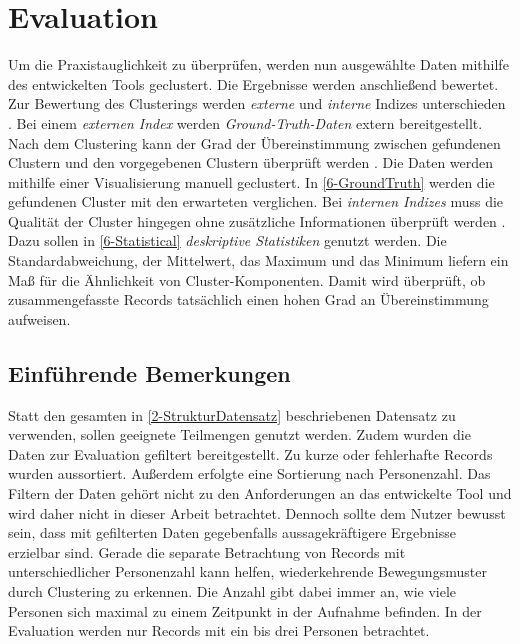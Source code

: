 \chapter{Evaluation}
\label{chapter6}
Um die Praxistauglichkeit zu überprüfen, werden nun ausgewählte Daten
mithilfe des entwickelten Tools geclustert.
Die Ergebnisse werden anschließend bewertet.
Zur Bewertung des Clusterings werden \emph{externe}
und \emph{interne} Indizes unterschieden \citep{aghabozorgi_time-series_2015, warren_liao_clustering_2005}.
Bei einem \emph{externen Index} werden \emph{Ground-Truth-Daten} extern bereitgestellt.
Nach dem Clustering kann der Grad der Übereinstimmung zwischen gefundenen Clustern
und den vorgegebenen Clustern überprüft werden \citep{aghabozorgi_time-series_2015, warren_liao_clustering_2005}.
Die Daten werden mithilfe einer Visualisierung manuell geclustert.
In \autoref{6-GroundTruth} werden die gefundenen Cluster mit den erwarteten verglichen.
Bei \emph{internen Indizes} muss die Qualität der Cluster hingegen
ohne zusätzliche Informationen überprüft werden \citep{aghabozorgi_time-series_2015, warren_liao_clustering_2005}.
Dazu sollen in \autoref{6-Statistical} \emph{deskriptive Statistiken} genutzt werden.
Die Standardabweichung, der Mittelwert, das Maximum und das Minimum liefern
ein Maß für die Ähnlichkeit von Cluster-Komponenten.
Damit wird überprüft,
ob zusammengefasste Records tatsächlich einen hohen Grad an Übereinstimmung aufweisen.

\section{Einführende Bemerkungen}
\label{6-Bemerkungen}
Statt den gesamten in \autoref{2-StrukturDatensatz} beschriebenen Datensatz zu verwenden,
sollen geeignete Teilmengen genutzt werden.
Zudem wurden die Daten zur Evaluation gefiltert bereitgestellt.
Zu kurze oder fehlerhafte Records wurden aussortiert.
Außerdem erfolgte eine Sortierung nach Personenzahl.
Das Filtern der Daten gehört nicht zu den Anforderungen an das entwickelte Tool
und wird daher nicht in dieser Arbeit betrachtet.
Dennoch sollte dem Nutzer bewusst sein,
dass mit gefilterten Daten gegebenfalls aussagekräftigere Ergebnisse erzielbar sind.
Gerade die separate Betrachtung von Records mit unterschiedlicher Personenzahl kann helfen,
wiederkehrende Bewegungsmuster durch Clustering zu erkennen.
Die Anzahl gibt dabei immer an, wie viele Personen sich maximal
zu einem Zeitpunkt in der Aufnahme befinden.
In der Evaluation werden nur Records mit ein bis drei Personen betrachtet.


